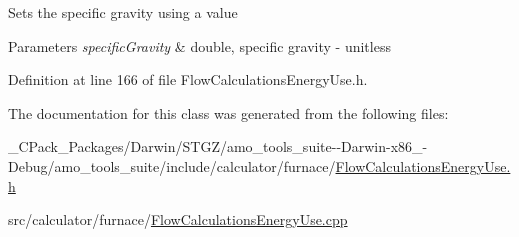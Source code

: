 Sets the specific gravity using a value


\begin{DoxyParams}{Parameters}
{\em specific\+Gravity} & double, specific gravity -\/ unitless \\
\hline
\end{DoxyParams}


Definition at line 166 of file Flow\+Calculations\+Energy\+Use.\+h.



The documentation for this class was generated from the following files\+:\begin{DoxyCompactItemize}
\item 
\+\_\+\+C\+Pack\+\_\+\+Packages/\+Darwin/\+S\+T\+G\+Z/amo\+\_\+tools\+\_\+suite-\/-\/\+Darwin-\/x86\+\_-\/\+Debug/amo\+\_\+tools\+\_\+suite/include/calculator/furnace/\hyperlink{___c_pack___packages_2_darwin_2_s_t_g_z_2amo__tools__suite--_darwin-x86__64-_debug_2amo__tools__6e959afd0519a9e21dc07e675a11bcdd}{Flow\+Calculations\+Energy\+Use.\+h}\item 
src/calculator/furnace/\hyperlink{_flow_calculations_energy_use_8cpp}{Flow\+Calculations\+Energy\+Use.\+cpp}\end{DoxyCompactItemize}
